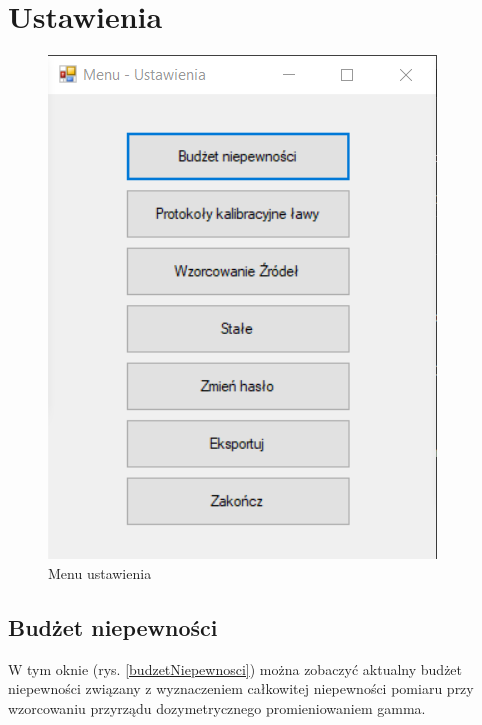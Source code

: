
\rozdzial

\section{Ustawienia}
\label{ustawienia}

\begin{figure}[htb]
	\centering
	\includegraphics{obrazki/Ustawienia/menu_ustawienia.png}
	\caption{Menu ustawienia}
	\label{menuUstawienia}
\end{figure}

\subsection{Budżet niepewności}
\label{budzet}

W tym oknie (rys. \ref{budzetNiepewnosci}) można zobaczyć aktualny budżet niepewności związany z wyznaczeniem całkowitej niepewności pomiaru przy wzorcowaniu przyrządu dozymetrycznego promieniowaniem gamma.

